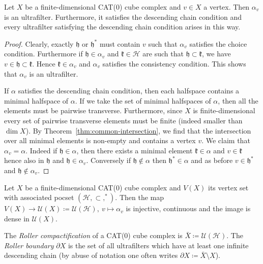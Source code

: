 \begin{lemma}
  \label{lem:principle-uf}
  Let \(X\) be a finite-dimensional CAT(0) cube complex and \(v \in X\) a vertex. Then \(\alpha_v\) is an ultrafilter. Furthermore, it satisfies the descending chain condition and every ultrafilter satisfying the descending chain condition arises in this way.
\end{lemma}

\begin{proof}
  Clearly, exactly \(\mathfrak{h}\) or \(\mathfrak{h}^\ast\) must contain \(v\) such that \(\alpha_v\) satisfies the choice condition. Furthermore if \(\mathfrak{h} \in \alpha_v\) and \(\mathfrak{k} \in \mathcal{H}\) are such that \(\mathfrak{h} \subset \mathfrak{k}\), we have \(v \in \mathfrak{h} \subset \mathfrak{k}\). Hence \(\mathfrak{k} \in \alpha_v\) and \(\alpha_v\) satisfies the consistency condition. This shows that \(\alpha_v\) is an ultrafilter.

    If \(\alpha\) satisfies the descending chain condition, then each halfspace contains a minimal halfspace of \(\alpha\). If we take the set of minimal halfspaces of \(\alpha\), then all the elements must be pairwise transverse. Furthermore, since \(X\) is finite-dimensional every set of pairwise transverse elements must be finite (indeed smaller than \(\dim X\)). By Theorem~\ref{thm:common-intersection}, we find that the intersection over all minimal elements is non-empty and contains a vertex \(v\). We claim that \(\alpha_v = \alpha\). Indeed if \(\mathfrak{h} \in \alpha\), then there exists a minimal element \(\mathfrak{k} \in \alpha\) and \(v \in \mathfrak{k}\) hence also in \(\mathfrak{h}\) and \(\mathfrak{h} \in \alpha_v\). Conversely if \(\mathfrak{h} \not \in \alpha\) then \(\mathfrak{h}^\ast \in \alpha\) and as before \(v \in \mathfrak{h}^\ast\) and \(\mathfrak{h} \not \in \alpha_v\).
\end{proof}

\begin{thm}
  \label{thm:roller-compactification}
  Let \(X\) be a finite-dimensional CAT(0) cube complex and \(V(X)\) its vertex set with associated pocset \((\mathcal{H}, \subset, ^\ast)\). Then the map \(V(X) \to \mathcal{U}(X) \coloneqq \mathcal{U}(\mathcal{H}),\ v \mapsto \alpha_v\) is injective, continuous and the image is dense in \(\mathcal{U}(X)\). 
\end{thm}

\begin{defin}
  The \emph{Roller compactification} of a CAT(0) cube complex is \(\bar X \coloneqq \mathcal{U}(\mathcal{H})\). The \emph{Roller boundary} \(\partial X\) is the set of all ultrafilters which have at least one infinite descending chain (by abuse of notation one often writes \(\partial X \coloneqq \bar X \setminus X\)).
\end{defin}

